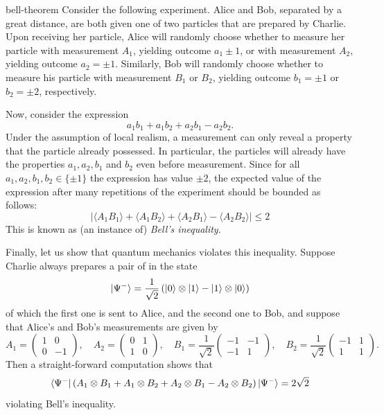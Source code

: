 \begin{example}{bell-theorem}
    Consider the following experiment. Alice and Bob, separated by a great distance, are both given one of two particles that are prepared by Charlie. Upon receiving her particle, Alice will randomly choose whether to measure her particle with measurement $A_1$, yielding outcome $a_1 \pm 1$, or with measurement $A_2$, yielding outcome $a_2 = \pm 1$. Similarly, Bob will randomly choose whether to measure his particle with measurement $B_1$ or $B_2$, yielding outcome $b_1 = \pm 1$ or $b_2 = \pm 2$, respectively.

    Now, consider the expression
    \[ a_1 b_1 + a_1 b_2 + a_2 b_1 - a_2 b_2 . \]
    Under the assumption of local realism, a measurement can only reveal a property that the particle already possessed. In particular, the particles will already have the properties $a_1, a_2, b_1$ and $b_2$ even before measurement. Since for all $a_1, a_2, b_1, b_2 \in \{ \pm 1 \}$ the expression has value $\pm 2$, the expected value of the expression after many repetitions of the experiment should be bounded as follows:
    \[ |\langle A_1 B_1 \rangle + \langle A_1 B_2 \rangle + \langle A_2 B_1 \rangle - \langle A_2 B_2 \rangle| \le 2 \]
    This is known as (an instance of) \textit{Bell's inequality}.

    Finally, let us show that quantum mechanics violates this inequality. Suppose Charlie always prepares a pair of  in the state
    \[ |\Psi^-\rangle = \frac{1}{\sqrt{2}} \left( |0\rangle \otimes |1\rangle - |1\rangle \otimes |0\rangle \right) \]
    of which the first one is sent to Alice, and the second one to Bob, and suppose that Alice's and Bob's measurements are given by
    \[ A_1 = \begin{pmatrix} 1 & 0 \\ 0 & -1 \end{pmatrix}, \quad A_2 = \begin{pmatrix} 0 & 1 \\ 1 & 0 \end{pmatrix}, \quad B_1 = \frac{1}{\sqrt{2}} \begin{pmatrix} -1 & -1 \\ -1 & 1 \end{pmatrix}, \quad B_2 = \frac{1}{\sqrt{2}} \begin{pmatrix} -1 & 1 \\ 1 & 1 \end{pmatrix} . \]
    Then a straight-forward computation shows that
    \[ \langle\Psi^-| \left( A_1 \otimes B_1  + A_1 \otimes B_2 + A_2 \otimes B_1 - A_2 \otimes B_2 \right) |\Psi^-\rangle = 2 \sqrt{2} \]
    violating Bell's inequality.
\end{example}

